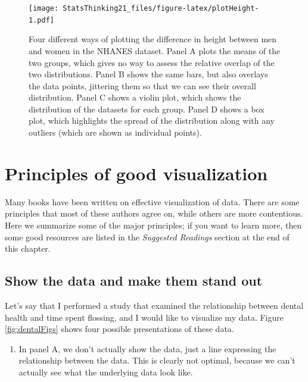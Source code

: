 \documentclass[12pt,]{book}
\providecommand{\tightlist}{%
  \setlength{\itemsep}{0pt}\setlength{\parskip}{0pt}}
\theoremstyle{definition}
\theoremstyle{definition}
\theoremstyle{definition}
\theoremstyle{remark}
\begin{document}
\begin{figure}
\centering
\texttt{[image: StatsThinking21\_files/figure-latex/plotHeight-1.pdf]}
\caption{\label{fig:plotHeight}Four different ways of plotting the difference in height between men and women in the NHANES dataset. Panel A plots the means of the two groups, which gives no way to assess the relative overlap of the two distributions. Panel B shows the same bars, but also overlays the data points, jittering them so that we can see their overall distribution. Panel C shows a violin plot, which shows the distribution of the datasets for each group. Panel D shows a box plot, which highlights the spread of the distribution along with any outliers (which are shown as individual points).}
\end{figure}

\hypertarget{principles-of-good-visualization}{%
\section{Principles of good visualization}\label{principles-of-good-visualization}}

Many books have been written on effective visualization of data. There are some principles that most of these authors agree on, while others are more contentious. Here we summarize some of the major principles; if you want to learn more, then some good resources are listed in the \emph{Suggested Readings} section at the end of this chapter.

\hypertarget{show-the-data-and-make-them-stand-out}{%
\subsection{Show the data and make them stand out}\label{show-the-data-and-make-them-stand-out}}

Let's say that I performed a study that examined the relationship between dental health and time spent flossing, and I would like to visualize my data. Figure \ref{fig:dentalFigs} shows four possible presentations of these data.

\begin{enumerate}
\def\labelenumi{\arabic{enumi}.}
\tightlist
\item
  In panel A, we don't actually show the data, just a line expressing the relationship between the data. This is clearly not optimal, because we can't actually see what the underlying data look like.
\end{enumerate}
\end{document}
